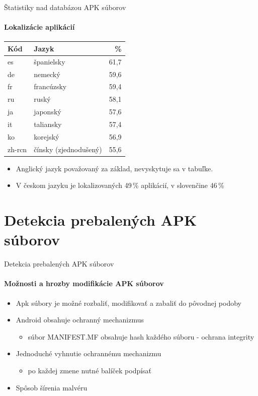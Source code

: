 \documentclass{beamer}
\begin{document}
     \begin{frame}[label=lists]{Štatistiky nad databázou APK súborov}
  \framesubtitle{Lokalizácie aplikácií}
\begin{table}[htb]
\centering
  \begin{tabular}{l l r}
    \textbf{Kód} & \textbf{Jazyk} &  \textbf{\%} \\\hline
    es & španielsky & 61,7 \\
    de & nemecký & 59,6 \\
    fr & francúzsky & 59,4 \\
    ru & ruský & 58,1 \\
    ja & japonský & 57,6 \\
    it & taliansky & 57,4 \\
	ko & korejský & 56,9 \\
	zh-rcn & čínsky (zjednodušený) & 55,6\\
    \hline
  \end{tabular}
  \label{tab:language}
\end{table}
\begin{itemize}
\item Anglický jazyk považovaný za základ, nevyskytuje sa v tabuľke.
\item V českom jazyku je lokalizovaných 49\,\% aplikácií, v slovenčine 46\,\%
\end{itemize}
\end{frame}

\section{Detekcia prebalených APK súborov}
  \begin{frame}[label=lists]{Detekcia prebalených APK súborov}
 	 \framesubtitle{Možnosti a hrozby modifikácie APK súborov}
	\begin{itemize}
	 	\item Apk súbory je možné rozbaliť, modifikovať a zabaliť do pôvodnej podoby
	 	\item Android obsahuje ochranný mechanizmus
	 	 \begin{itemize}
	 	 	\item súbor MANIFEST.MF obsahuje hash každého súboru - ochrana 	integrity
		 \end{itemize}	 
		 \item Jednoduché vyhnutie ochrannému mechanizmu 
	 	 \begin{itemize}
	 	 	\item po každej zmene nutné balíček podpísať
		 \end{itemize}	 
		 \item Spôsob šírenia malvéru	  
	\end{itemize}
  \end{frame} 
  
\end{document}
